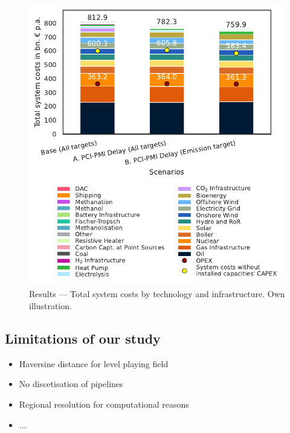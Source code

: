 \documentclass[preprint,12pt]{elsarticle}
\begin{document}
\begin{figure}[htbp]
  \centering
  \includegraphics[width=\linewidth]{system_costs}
  \caption{Results --- Total system costs by technology and infrastructure. Own illustration.}
  \label{fig:system_costs}
\end{figure}

\subsection{Limitations of our study}
\begin{itemize}
  \item Haversine distance for level playing field
  \item No discetisation of pipelines
  \item Regional resolution for computational reasons
  \item ...
\end{itemize}

\newpage
\end{document}
